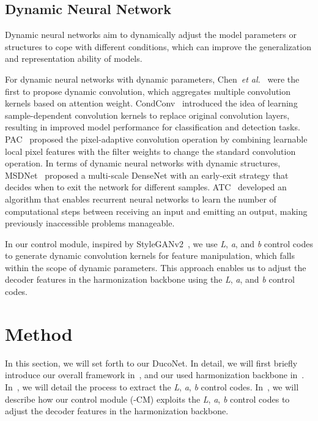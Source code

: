 \documentclass[sigconf]{acmart}
\begin{document}
\subsection{Dynamic Neural Network}
Dynamic neural networks aim to dynamically adjust the model parameters or structures to cope with different conditions, which can improve the generalization and representation ability of models.

For dynamic neural networks with dynamic parameters, Chen~\emph{et al.}~\cite{dynamic_conv} were the first to propose dynamic convolution, which aggregates multiple convolution kernels based on attention weight. 
CondConv~\cite{condconv} introduced the idea of learning sample-dependent convolution kernels to replace original convolution layers, resulting in improved model performance for classification and detection tasks. 
PAC~\cite{PAC} proposed the pixel-adaptive convolution operation by combining learnable local pixel features with the filter weights to change the standard convolution operation. 
In terms of dynamic neural networks with dynamic structures, MSDNet~\cite{huang2017multi} proposed a multi-scale DenseNet with an early-exit strategy that decides when to exit the network for different samples. 
ATC~\cite{graves2016adaptive} developed an algorithm that enables recurrent neural networks to learn the number of computational steps between receiving an input and emitting an output, making previously inaccessible problems manageable.

In our  control module, inspired by StyleGANv2~\cite{styleganv2}, we use \textit{L}, \textit{a}, and \textit{b} control codes to generate dynamic convolution kernels for feature manipulation, which falls within the scope of dynamic parameters. 
This approach enables us to adjust the decoder features in the harmonization backbone using the \textit{L}, \textit{a}, and \textit{b} control codes.

\section{Method} \label{section:Method}

In this section, we will set forth to our DucoNet. 
In detail, we will first briefly introduce our overall framework in~, and our used harmonization backbone in~.
In~, we will detail the process to extract the \textit{L}, \textit{a}, \textit{b} control codes.
In~, we will describe how our  control module (-CM) exploits the \textit{L}, \textit{a}, \textit{b} control codes to adjust the decoder features in the harmonization backbone.
\end{document}
